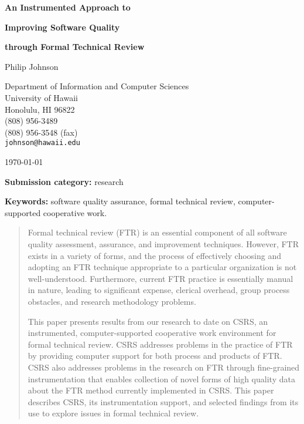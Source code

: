 \begin{titlepage}
\vspace*{1in}
\begin{center}
   
\Large

{\bf An Instrumented Approach to} \medskip\par
{\bf Improving Software Quality}   \medskip\par
{\bf through Formal Technical Review}  \bigskip\par
                                         \bigskip\par

\normalsize

Philip Johnson                           \medskip\par
Department of Information and Computer Sciences\\ 
University of Hawaii\\ 
Honolulu, HI 96822\\                       
(808) 956-3489\\
(808) 956-3548 (fax)\\
{\tt johnson@hawaii.edu}                 \bigskip\par

\today                                   \bigskip\par

{\bf Submission category:} research      \bigskip\par

{\bf Keywords:}  software quality assurance, formal technical review,
computer-supported cooperative work.      \bigskip\par


\begin{abstract}
  
  Formal technical review (FTR) is an essential component of all software
  quality assessment, assurance, and improvement techniques.  However, FTR
  exists in a variety of forms, and the process of effectively choosing and
  adopting an FTR technique appropriate to a particular organization is not
  well-understood.  Furthermore, current FTR practice is essentially manual
  in nature, leading to significant expense, clerical overhead, group process
  obstacles, and research methodology problems.
  
  This paper presents results from our research to date on CSRS, an
  instrumented, computer-supported cooperative work environment for
  formal technical review.  CSRS addresses problems in the practice of
  FTR by providing computer support for both process and products of FTR.
  CSRS also addresses problems in the research on FTR through
  fine-grained instrumentation that enables collection of novel forms
  of high quality data about the FTR method currently implemented in CSRS.
  This paper describes CSRS, its instrumentation support, and selected
  findings from its use to explore issues in formal technical review.
  
\end{abstract}


\end{center}
\end{titlepage}
